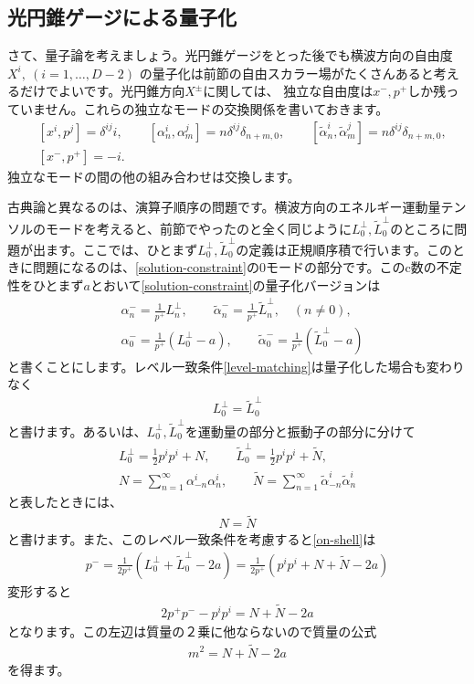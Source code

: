 \documentclass[report,paper=a4, fontsize=12pt, line_length=16cm, number_of_lines=34,dvipdfmx]{jlreq}
\numberwithin{equation}{chapter}
\numberwithin{equation}{section}
\newcommand{\alphat}{\tilde{\alpha}}
\newcommand{\Nt}{\widetilde{N}}
\newcommand{\Lp}{L^{\perp}}
\newcommand{\Ltp}{\widetilde{L}^{\perp}}
\begin{document}
\subsection{光円錐ゲージによる量子化}
さて、量子論を考えましょう。光円錐ゲージをとった後でも横波方向の自由度$X^{i},\ (i=1,\dots, D-2)$
の量子化は前節の自由スカラー場がたくさんあると考えるだけでよいです。光円錐方向$X^{\pm}$に関しては、
独立な自由度は$x^{-},p^{+}$しか残っていません。これらの独立なモードの交換関係を書いておきます。
\begin{align}
&[x^{i},p^{j}]=\delta^{ij}i,\qquad
[\alpha_n^{i},\alpha_m^{j}]=n\delta^{ij}\delta_{n+m,0},\qquad
[\alphat_n^{i},\alphat_m^{j}]=n\delta^{ij}\delta_{n+m,0},\\
&[x^{-},p^{+}]=-i.
\end{align}
独立なモードの間の他の組み合わせは交換します。

古典論と異なるのは、演算子順序の問題です。横波方向のエネルギー運動量テンソルのモードを考えると、前節でやったのと全く同じように$\Lp_0,\Ltp_0$のところに問題が出ます。ここでは、ひとまず$\Lp_0,\Ltp_0$の定義は正規順序積で行います。このときに問題になるのは、\eqref{solution-constraint}の0モードの部分です。このc数の不定性をひとまず$a$とおいて\eqref{solution-constraint}の量子化バージョンは
\begin{align}
&
\alpha_n^{-}=\frac{1}{p^{+}}\Lp_n,\qquad
\alphat_n^{-}=\frac{1}{p^{+}}\Ltp_n,\quad (n\ne 0),\\
&
\alpha_0^{-}=\frac{1}{p^{+}}(\Lp_0-a),\qquad
\alphat_0^{-}=\frac{1}{p^{+}}(\Ltp_0-a)\label{on-shell}
\end{align}
と書くことにします。レベル一致条件\eqref{level-matching}は量子化した場合も変わりなく
\begin{align}
\Lp_0=\Ltp_0
\end{align}
と書けます。あるいは、$\Lp_0,\Ltp_0$を運動量の部分と振動子の部分に分けて
\begin{align}
\Lp_0=\frac12 p^ip^i+N,\qquad
\Ltp_0=\frac12 p^ip^i+\Nt,\\
N=\sum_{n=1}^\infty\alpha^{i}_{-n}\alpha^{i}_{n},\qquad
\Nt=\sum_{n=1}^\infty\alphat^{i}_{-n}\alphat^{i}_{n}
\end{align}
と表したときには、
\begin{align}
N=\Nt
\label{level-matching2}
\end{align}
と書けます。また、このレベル一致条件を考慮すると\eqref{on-shell}は
\begin{align}
p^{-}=\frac{1}{2p^{+}}(\Lp_0+\Ltp_0-2a)
=\frac{1}{2p^{+}}(p^ip^i+N+\Nt-2a)
\end{align}
変形すると
\begin{align}
2p^{+}p^{-}-p^i p^i=N+\Nt-2a
\end{align}
となります。この左辺は質量の２乗に他ならないので質量の公式
\begin{align}
m^2=N+\Nt-2a
\label{mass-formula}
\end{align}
を得ます。
\end{document}
